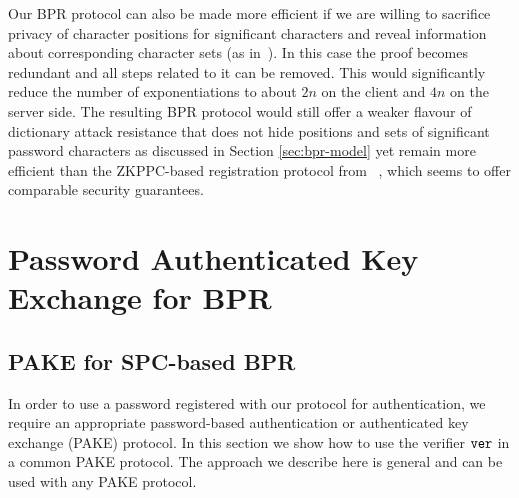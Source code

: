 %
Our BPR protocol can also be made more efficient if we are willing to sacrifice privacy of character positions for significant characters and reveal information about corresponding character sets (as in~\cite{KieferM14}). In this case the proof \PoS becomes redundant and all steps related to it can be removed. This would significantly reduce the number of exponentiations to about $2n$ on the client and $4n$ on the server side. The resulting BPR protocol would still offer a weaker flavour of dictionary attack resistance that does not hide positions and sets of significant password characters as discussed in Section \ref{sec:bpr-model} yet remain more efficient than the ZKPPC-based registration protocol from ~\cite{KieferM14}, which seems to offer comparable security guarantees.


\section{Password Authenticated Key Exchange for BPR}
\subsection{PAKE for SPC-based BPR}
In order to use a password registered with our protocol for authentication, we require an appropriate password-based authentication or authenticated key exchange (PAKE) protocol.
In this section we show how to use the verifier $\mathtt{ver}$ in a common PAKE protocol. The approach we describe here is general and can be used with any PAKE protocol.

